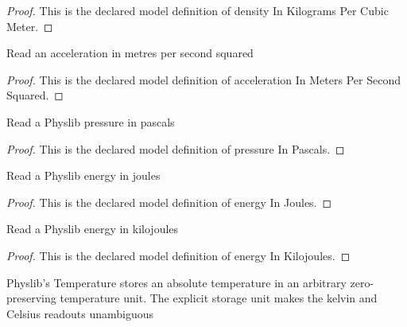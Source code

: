 \begin{proof}
  This is the declared model definition of density In Kilograms Per Cubic Meter.
\end{proof}
\begin{definition}
  \label{def:physics:phyx-mini-0457:phyxminiproblems-problemphyxmini0457-accelerationinmeterspersecondsquared}
  Read an acceleration in metres per second squared
\end{definition}
\begin{proof}
  This is the declared model definition of acceleration In Meters Per Second Squared.
\end{proof}
\begin{definition}
  \label{def:physics:phyx-mini-0457:phyxminiproblems-problemphyxmini0457-pressureinpascals}
  Read a Physlib pressure in pascals
\end{definition}
\begin{proof}
  This is the declared model definition of pressure In Pascals.
\end{proof}
\begin{definition}
  \label{def:physics:phyx-mini-0457:phyxminiproblems-problemphyxmini0457-energyinjoules}
  Read a Physlib energy in joules
\end{definition}
\begin{proof}
  This is the declared model definition of energy In Joules.
\end{proof}
\begin{definition}
  \label{def:physics:phyx-mini-0457:phyxminiproblems-problemphyxmini0457-energyinkilojoules}
  Read a Physlib energy in kilojoules
\end{definition}
\begin{proof}
  This is the declared model definition of energy In Kilojoules.
\end{proof}
\begin{definition}
  \label{def:physics:phyx-mini-0457:phyxminiproblems-problemphyxmini0457-temperatureinkelvin}
  Physlib's Temperature stores an absolute temperature in an arbitrary zero-preserving temperature unit. The explicit storage unit makes the kelvin and Celsius readouts unambiguous
\end{definition}
